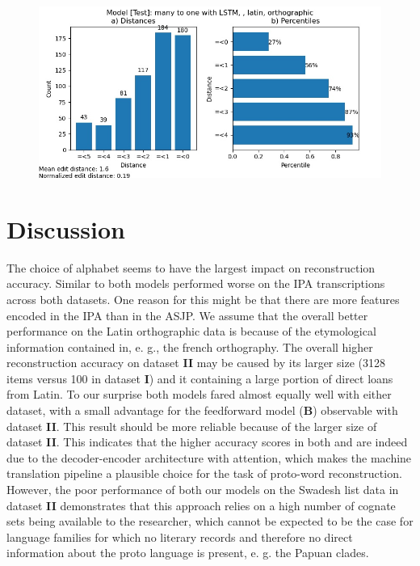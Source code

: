 \begin{figure}
    \centering
    \includegraphics[width=\textwidth]{ciobanu_many2one_test_latin_ortho.jpg}
    \label{fig:sdtlo}
\end{figure}
\section{Discussion}
The choice of alphabet seems to have the largest impact on reconstruction accuracy. Similar to \citet{meloni2019ab} both models performed worse on the IPA transcriptions across both datasets. One reason for this might be that there are more features encoded in the IPA than in the ASJP.
We assume that the overall better performance on the Latin orthographic data is because of the etymological information contained in, e. g., the french orthography. The overall higher reconstruction accuracy on dataset \textbf{II} may be caused by its larger size (3128 items versus 100 in dataset \textbf{I}) and it containing a large portion of direct loans from Latin.
To our surprise both models fared almost equally well with either dataset, with a small advantage for the feedforward model (\textbf{B}) observable with dataset \textbf{II}. This result should be more reliable because of the larger size of dataset \textbf{II}. This indicates that the higher accuracy scores in both \citet{ciobanu-dinu-2018-ab} and \citet{meloni2019ab} are indeed due to the decoder-encoder architecture with attention, which makes the machine translation pipeline a plausible choice for the task of proto-word reconstruction. However, the poor performance of both our models on the Swadesh list data in dataset \textbf{II} demonstrates that this approach relies on a high number of cognate sets being available to the researcher, which cannot be expected to be the case for language families for which no literary records and therefore no direct information about the proto language is present, e. g. the Papuan clades.
 
